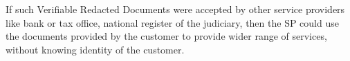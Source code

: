 \documentclass{article}
\begin{document}
If such Verifiable Redacted Documents were accepted by other service providers like bank or tax office, national register of the judiciary, then the SP could use the documents provided by the customer to provide wider range of services, without knowing identity of the customer.






\end{document}
